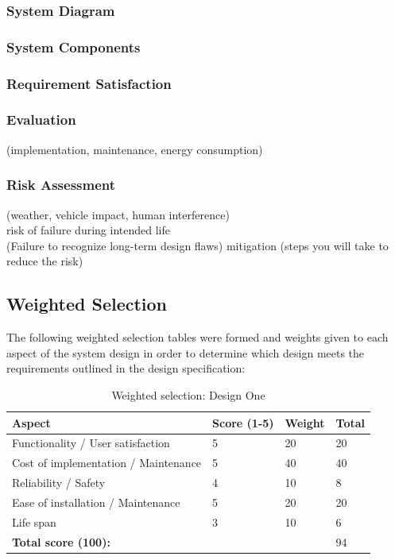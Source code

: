\subsubsection{System Diagram}
\subsubsection{System Components}
\subsubsection{Requirement Satisfaction}

\subsubsection{Evaluation}
(implementation, maintenance, energy consumption) \\

\subsubsection{Risk Assessment}
(weather, vehicle impact, human interference) \\
risk of failure during intended life \\
(Failure to recognize long-term design flaws)
mitigation (steps you will take to reduce the risk) \\

\newpage
\subsection{Weighted Selection}
The following weighted selection tables were formed and weights given to each aspect of the system design in order to determine which design meets the requirements outlined in the design specification:

\begin{table}[H]
\centering
\caption{Weighted selection: Design One\cite{handout}}
\label{my-label}
\begin{tabular}{l|l|l|l|}
\textbf{Aspect}                      & \textbf{Score (1-5)} & \textbf{Weight} & \textbf{Total} \\ \hline
Functionality / User satisfaction    & 5                     & 20                & 20               \\
Cost of implementation / Maintenance & 5                     & 40                & 40               \\
Reliability / Safety                 & 4                     & 10                & 8                \\
Ease of installation / Maintenance   & 5                     & 20                & 20               \\
Life span                            & 3                     & 10                & 6                \\ \hline
\textbf{Total score (100):}          &                       &                   & 94              
\end{tabular}
\end{table}

